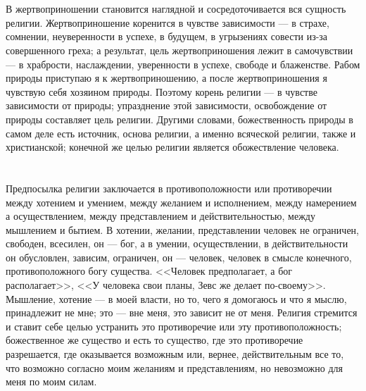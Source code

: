 \documentclass[12pt]{article}
\begin{document}
\section{}

В жертвоприношении становится наглядной и сосредоточивается вся сущность религии. Жертвоприношение коренится в чувстве зависимости --- в страхе, сомнении, неуверенности в успехе, в будущем, в угрызениях совести из-за совершенного греха; а результат, цель жертвоприношения лежит в самочувствии --- в храбрости, наслаждении, уверенности в успехе, свободе и блаженстве. Рабом природы приступаю я к жертвоприношению, а после жертвоприношения я чувствую себя хозяином природы. Поэтому корень религии --- в чувстве зависимости от природы; упразднение этой зависимости, освобождение от природы составляет цель религии. Другими словами, божественность природы в самом деле есть источник, основа религии, а именно всяческой религии, также и христианской; конечной же целью религии является обожествление человека.



\section{}

Предпосылка религии заключается в противоположности или противоречии между хотением и умением, между желанием и исполнением, между намерением а осуществлением, между представлением и действительностью, между мышлением и бытием. В хотении, желании, представлении человек не ограничен, свободен, всесилен, он --- бог, а в умении, осуществлении, в действительности он обусловлен, зависим, ограничен, он --- человек, человек в смысле конечного, противоположного богу существа. <<Человек предполагает, а бог располагает>>, <<У человека свои планы, Зевс же делает по-своему>>. Мышление, хотение --- в моей власти, но то, чего я домогаюсь и что я мыслю, принадлежит не мне; это --- вне меня, это зависит не от меня. Религия стремится и ставит себе целью устранить это противоречие или эту противоположность; божественное же существо и есть то существо, где это противоречие разрешается, где оказывается возможным или, вернее, действительным все то, что возможно согласно моим желаниям и представлениям, но невозможно для меня по моим силам.



\section{}
\end{document}
